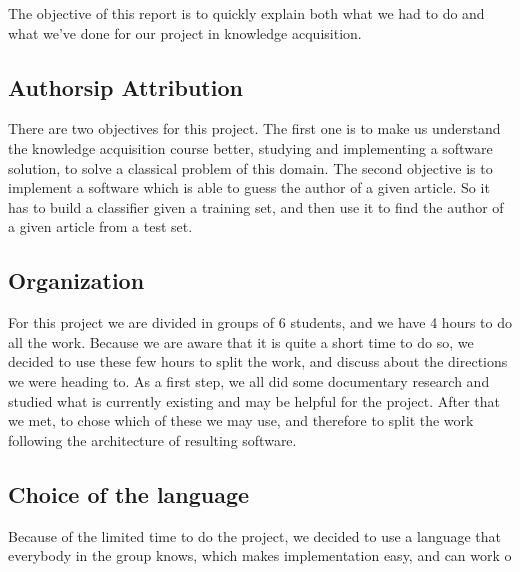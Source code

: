 The objective of this report is to quickly explain both what we had to do and what we've done for our project in knowledge acquisition. 

\subsection{Authorsip Attribution}

There are two objectives for this project. The first one is to make us understand the knowledge acquisition course better, studying and implementing a software solution, to solve a classical problem of this domain. The second objective is to implement a software which is able to guess the author of a given article. So it has to build a classifier given a training set, and then use it to find the author of a given article from a test set.

\subsection{Organization}

For this project we are divided in groups of 6 students, and we have 4 hours to do all the work. Because we are aware that it is quite a short time to do so, we decided to use these few hours to split the work, and discuss about the directions we were heading to. 
As a first step, we all did some documentary research and studied what is currently existing and may be helpful for the project. After that we met, to chose which of these we may use, and therefore to split the work following the architecture of resulting software.

\subsection{Choice of the language}

Because of the limited time to do the project, we decided to use a language that everybody in the group knows, which makes implementation easy, and can work o